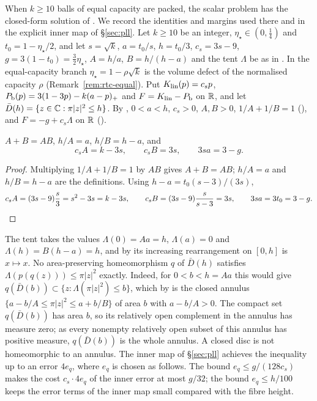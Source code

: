 When $k\ge10$ balls of equal capacity are packed, the scalar problem has the closed-form solution of
. We record the identities and margins used there and in the explicit inner map of
\S\ref{sec:pll}. Let $k\ge10$ be an integer, $\eta_\star\in(0,\frac14)$ and $t_0=1-\eta_\star/2$, and let
$s=\sqrt k$, $a=t_0/s$, $h=t_0/3$, $c_s=3s-9$, $g=3(1-t_0)=\frac32\eta_\star$, $A=h/a$, $B=h/(h-a)$ and the tent $\Lambda$ be as
in . In the equal-capacity branch $\eta_\star=1-\rho\sqrt k$ is the volume defect of the normalised
capacity $\rho$ (Remark~\ref{rem:rtc-equal}). Put $K_{\rm lin}(p)=c_sp$, $P_{\mathrm b}(p)=3(1-3p)-k(a-p)_+$ and
$F=K_{\rm lin}-P_{\mathrm b}$ on $\mathbb{R}$, and let $\bar D(h)=\{z\in\mathbb{C}:\pi|z|^2\le h\}$. By , $0<a<h$, $c_s>0$,
$A,B>0$, $1/A+1/B=1$ (), and $F=-g+c_s\Lambda$ on $\mathbb{R}$ ().

\begin{lemma}\label{lem:fcp-AB}
$A+B=AB$, $h/A=a$, $h/B=h-a$, and
\[
 c_sA=k-3s,\qquad c_sB=3s,\qquad 3sa=3-g .
\]
\end{lemma}

\begin{proof}
Multiplying $1/A+1/B=1$ by $AB$ gives $A+B=AB$; $h/A=a$ and $h/B=h-a$ are the definitions. Using
$h-a=t_0(s-3)/(3s)$,
\[
 c_sA=(3s-9)\frac s3=s^2-3s=k-3s,\qquad c_sB=(3s-9)\frac{s}{s-3}=3s,\qquad 3sa=3t_0=3-g .\qedhere
\]
\end{proof}

The tent takes the values
$\Lambda(0)=Aa=h$, $\Lambda(a)=0$ and $\Lambda(h)=B(h-a)=h$, and by  its
increasing rearrangement on $[0,h]$ is $x\mapsto x$. No area-preserving homeomorphism $q$ of $\bar D(h)$ satisfies
$\Lambda(p(q(z)))\le\pi|z|^2$ exactly. Indeed, for $0<b<h=Aa$ this would give
$q(\bar D(b))\subset\{z:\Lambda(\pi|z|^2)\le b\}$, which by  is the closed annulus
$\{a-b/A\le\pi|z|^2\le a+b/B\}$ of area $b$ with $a-b/A>0$. The compact set $q(\bar D(b))$ has area $b$, so its
relatively open complement in the annulus has measure zero; as every nonempty relatively open subset of this annulus has
positive measure, $q(\bar D(b))$ is the whole annulus. A closed disc is not homeomorphic to an annulus. The inner map of
\S\ref{sec:pll} achieves the inequality up to an error $4e_q$, where $e_q$ is chosen as follows. The bound
$e_q\le g/(128c_s)$ makes the cost $c_s\cdot4e_q$ of the inner error at most $g/32$; the bound $e_q\le h/100$ keeps the
error terms of the inner map small compared with the fibre height.

